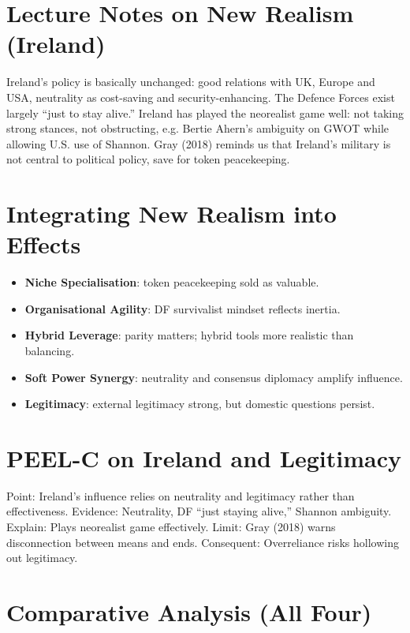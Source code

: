 \section*{Lecture Notes on New Realism (Ireland)}

Ireland’s policy is basically unchanged: good relations with UK, Europe and USA, neutrality as cost-saving and security-enhancing. The Defence Forces exist largely “just to stay alive.” Ireland has played the neorealist game well: not taking strong stances, not obstructing, e.g. Bertie Ahern’s ambiguity on GWOT while allowing U.S. use of Shannon. Gray (2018) reminds us that Ireland’s military is not central to political policy, save for token peacekeeping.  

\section*{Integrating New Realism into Effects}

\begin{itemize}
	\item \textbf{Niche Specialisation}: token peacekeeping sold as valuable.  
	\item \textbf{Organisational Agility}: DF survivalist mindset reflects inertia.  
	\item \textbf{Hybrid Leverage}: parity matters; hybrid tools more realistic than balancing.  
	\item \textbf{Soft Power Synergy}: neutrality and consensus diplomacy amplify influence.  
	\item \textbf{Legitimacy}: external legitimacy strong, but domestic questions persist.  
\end{itemize}

\section*{PEEL-C on Ireland and Legitimacy}

Point: Ireland’s influence relies on neutrality and legitimacy rather than effectiveness.  
Evidence: Neutrality, DF “just staying alive,” Shannon ambiguity.  
Explain: Plays neorealist game effectively.  
Limit: Gray (2018) warns disconnection between means and ends.  
Consequent: Overreliance risks hollowing out legitimacy.  

\section*{Comparative Analysis (All Four)}

